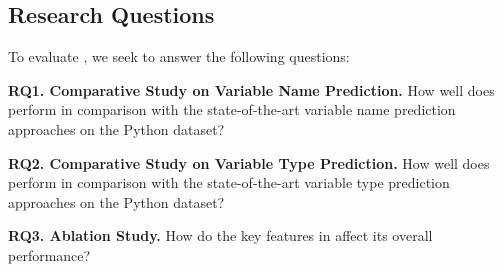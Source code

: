\subsection{Research Questions}

To evaluate {\tool}, we seek to answer the following questions:

\noindent\textbf{RQ1. Comparative Study on Variable Name Prediction.}  How well does {\tool} perform in comparison with the state-of-the-art variable name prediction approaches on the Python dataset?

\noindent\textbf{RQ2. Comparative Study on Variable Type Prediction.}  How well does {\tool} perform in comparison with the state-of-the-art variable type prediction approaches on the Python dataset?

\noindent\textbf{RQ3. Ablation Study.} How do the key features in {\tool} affect its overall performance?
